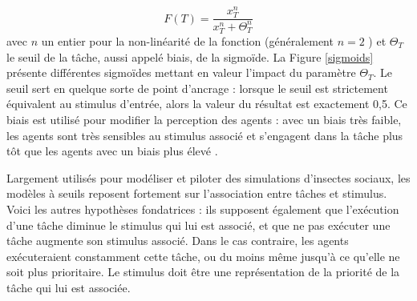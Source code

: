 \begin{equation}
\label{equationSigmoid}
	F(T) = \frac{x_T^n}{x_T^n + \Theta_T^n}
\end{equation}	
 avec $n$ un entier pour la non-linéarité de la fonction (généralement $n=2$ \cite{schmickl_taskselsim_2008}) et $\Theta_T$ le seuil de la tâche, aussi appelé biais, de la sigmoïde. La Figure \ref{sigmoids} présente différentes sigmoïdes mettant en valeur l'impact du paramètre $\Theta_T$. Le seuil sert en quelque sorte de point d'ancrage : lorsque le seuil est strictement équivalent au stimulus d'entrée, alors la valeur du résultat est exactement 0,5. Ce biais est utilisé pour modifier la perception des agents : avec un biais très faible, les agents sont très sensibles au stimulus associé et s'engagent dans la tâche plus tôt que les agents avec un biais plus élevé \cite{dornhaus_task_nodate}. 
        
        Largement utilisés pour modéliser et piloter des simulations d'insectes sociaux, les modèles à seuils reposent fortement sur l'association entre tâches et stimulus. Voici les autres hypothèses fondatrices : ils supposent également que l'exécution d'une tâche diminue le stimulus qui lui est associé, et que ne pas exécuter une tâche augmente son stimulus associé. Dans le cas contraire, les agents exécuteraient constamment cette tâche, ou du moins même jusqu'à ce qu'elle ne soit plus prioritaire. Le stimulus doit être une représentation de la priorité de la tâche qui lui est associée. 
        
